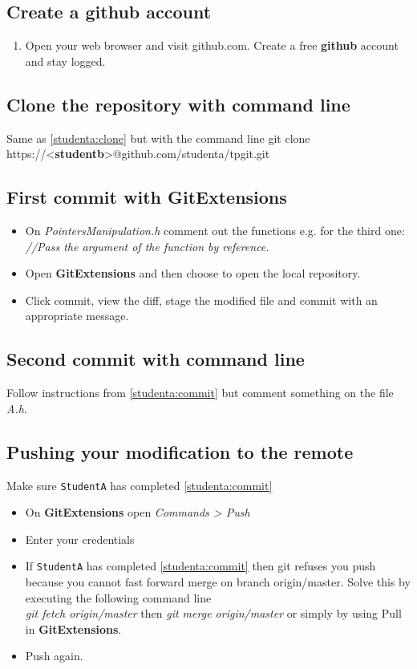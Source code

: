 \documentclass[11pt,amsfonts,amsmath]{article}
\begin{document}
\subsection{Create a \textbf{github} account}\label{studentb:create}
\begin{enumerate}
\item Open your web browser and visit github.com. Create a free \textbf{github} account and stay logged.
\end{enumerate}
\subsection{Clone the repository with command line}
Same as \ref{studenta:clone} but with the command line  git clone https://<\textbf{studentb}>@github.com/studenta/tpgit.git
\subsection{First commit with \textbf{GitExtensions}}\label{studentb:commitgitext}
\begin{itemize}
\item On \emph{PointersManipulation.h} comment out the functions e.g. for the third one:\\
\emph{//Pass the argument of the function by reference.}
\item Open \textbf{GitExtensions} and then choose to open the local repository.
\item Click commit, view the diff, stage the modified file and commit with an appropriate message.
\end{itemize}
\subsection{Second commit with command line}
Follow instructions from \ref{studenta:commit} but comment something on the file \emph{A.h}.
\subsection{Pushing your modification to the remote}\label{studentb:pull}
Make sure \texttt{StudentA} has completed \ref{studenta:commit}
\begin{itemize}
\item On \textbf{GitExtensions} open \emph{Commands > Push}
\item Enter your credentials
\item If  \texttt{StudentA} has completed \ref{studenta:commit} then git refuses you push because you cannot fast forward merge on branch origin/master.
Solve this by executing the following command line\\
\emph{git fetch origin/master} then \emph{git merge origin/master} or simply by using Pull in \textbf{GitExtensions}.
\item Push again.
\end{itemize}
\end{document}
